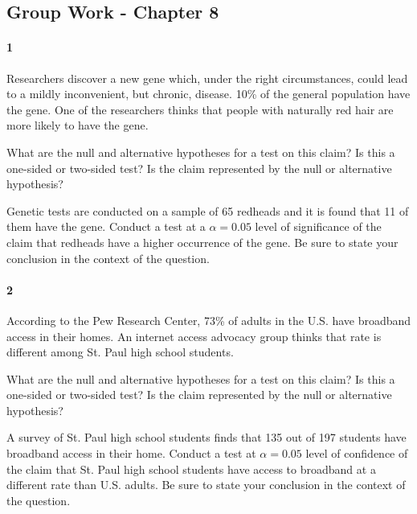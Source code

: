 \documentclass{article}
\begin{document}
\begin{flushleft}
\section*{Group Work - Chapter 8}
\paragraph{1} Researchers discover a new gene which, under the right circumstances, could lead to a mildly inconvenient, but chronic, disease. 10\% of the general population have the gene. One of the researchers thinks that people with naturally red hair are more likely to have the gene.
\begin{enumalpha}
\item What are the null and alternative hypotheses for a test on this claim? Is this a one-sided or two-sided test? Is the claim represented by the null or alternative hypothesis?
\vspace{2.5in}
\item Genetic tests are conducted on a sample of 65 redheads and it is found that 11 of them have the gene. Conduct a test at a $\alpha = 0.05$ level of significance of the claim that redheads have a higher occurrence of the gene. Be sure to state your conclusion in the context of the question.
\end{enumalpha}



\newpage
\paragraph{2} According to the Pew Research Center, 73\% of adults in the U.S. have broadband access in their homes. An internet access advocacy group thinks that rate is different among St. Paul high school students.
\begin{enumalpha}
\item What are the null and alternative hypotheses for a test on this claim? Is this a one-sided or two-sided test? Is the claim represented by the null or alternative hypothesis?
\vspace{2.5in}
\item A survey of St. Paul high school students finds that 135 out of 197 students have broadband access in their home. Conduct a test at $\alpha=0.05$ level of confidence of the claim that St. Paul high school students have access to broadband at a different rate than U.S. adults. Be sure to state your conclusion in the context of the question.
\end{enumalpha}


\end{flushleft}
\end{document}
